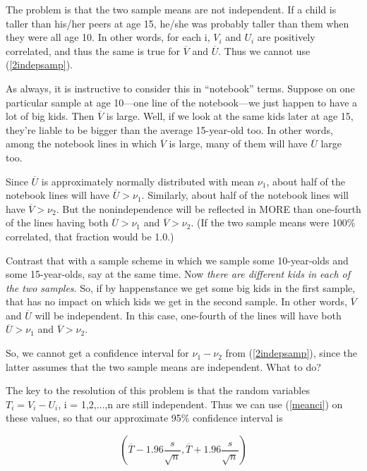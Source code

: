 The problem is that the two sample means are not independent.  If a
child is taller than his/her peers at age 15, he/she was probably taller
than them when they were all age 10.  In other words, for each i, $V_i$
and $U_i$ are positively correlated, and thus the same is true for
$\overline{V}$ and $\overline{U}$.  Thus we cannot use (\ref{2indepsamp}).

As always, it is instructive to consider this in ``notebook'' terms.
Suppose on one particular sample at age 10---one line of the
notebook---we just happen to have a lot of big kids.  Then
$\overline{V}$ is large.  Well, if we look at the same kids later at age
15, they're liable to be bigger than the average 15-year-old too.  In
other words, among the notebook lines in which $\overline{V}$ is large,
many of them will have $\overline{U}$ large too.

Since $\overline{U}$ is approximately normally distributed with mean
$\nu_1$, about half of the notebook lines will have $\overline{U} >
\nu_1$.  Similarly, about half of the notebook lines will have
$\overline{V} > \nu_2$.  But the nonindependence will be reflected in
MORE than one-fourth of the lines having both $\overline{U} > \nu_1$ and
$\overline{V} > \nu_2$.  (If the two sample means were 100\% correlated,
that fraction would be 1.0.)

Contrast that with a sample scheme in which we sample some 10-year-olds
and some 15-year-olds, say at the same time.  Now {\it there are
different kids in each of the two samples}.  So, if by happenstance we
get some big kids in the first sample, that has no impact on which kids
we get in the second sample.  In other words, $\overline{V}$ and
$\overline{U}$ will be independent.  In this case, one-fourth of the
lines will have both $\overline{U} > \nu_1$ and $\overline{V} > \nu_2$.

So, we cannot get a confidence interval for $\nu_1 - \nu_2$ from
(\ref{2indepsamp}), since the latter assumes that the two sample means
are independent.  What to do?

The key to the resolution of this problem is that the random variables
$T_i = V_i - U_i$, i = 1,2,...,n are still independent.  Thus we can use
(\ref{meanci}) on these values, so that our approximate 95\% confidence
interval is

\begin{equation}
(\overline{T} - 1.96 \frac{s}{\sqrt{n}}, \overline{T} + 1.96 \frac{s}{\sqrt{n}})
\end{equation}

